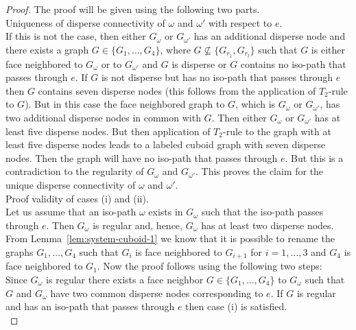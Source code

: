 \documentclass[a4paper,11pt]{article}
\begin{document}
\begin{proof}
The proof will be given using the following two parts.\\

 Uniqueness of disperse connectivity of $\omega$ and $\omega'$ with respect to $e$.\\

If this is not the case, then either $G_{\omega}$ or $G_{\omega'}$ has an additional disperse node
and there exists a graph $G\in\{G_1,\ldots,G_4\}$, where $G\nsubseteq\{G_{r_1},G_{r_l}\}$ such that
$G$ is either face neighbored to $G_{\omega}$ or to $G_{\omega'}$ and $G$ is disperse or $G$ contains
no iso-path that passes through $e$. If $G$ is not disperse but has no iso-path that passes through $e$
then $G$ contains seven disperse nodes (this follows from the application of $T_2$-rule to $G$). But
in this case the face neighbored graph to $G$, which is $G_{\omega}$ or $G_{\omega'}$, has
two additional disperse nodes in common with $G$. Then either $G_{\omega}$ or $G_{\omega'}$ has at
least five disperse nodes. But then application of $T_2$-rule to the graph with at least five disperse
nodes leads to a labeled cuboid graph with seven disperse nodes. Then the graph will have no iso-path that
passes through $e$. But this is a contradiction to the regularity of $G_{\omega}$ and $G_{\omega'}$.
This proves the claim for the unique disperse connectivity of $\omega$ and $\omega'$.\\

 Proof validity of cases (i) and (ii).\\

Let us assume that an iso-path $\omega$ exists in $G_{\omega}$ such that the iso-path passes
through $e$. Then $G_{\omega}$ is regular and, hence, $G_{\omega}$ has at least two disperse nodes.
From Lemma~\ref{lem:system-cuboid-1} we know that it is possible to rename the graphs $G_1,\ldots,G_4$
such that $G_i$ is face neighbored to $G_{i+1}$ for $i=1,\ldots,3$ and $G_4$ is face neighbored
to $G_1$. Now the proof follows using the following two steps:\\

 Since $G_{\omega}$ is regular there exists a face neighbor
$G\in \{G_1,\ldots,G_4\}$ to $G_{\omega}$ such that $G$ and $G_{\omega}$ have two common disperse
nodes corresponding to $e$. If $G$ is regular and has an iso-path that passes through $e$ then case (i)
is satisfied.\\


\end{proof}
\end{document}
